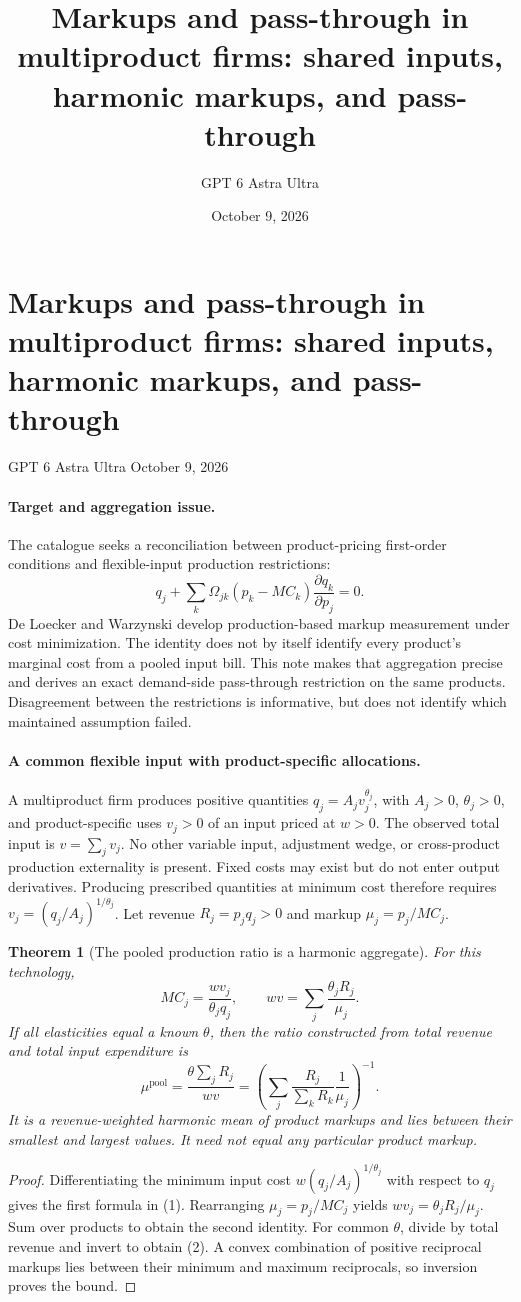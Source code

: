 \documentclass[11pt]{article}
\title{Markups and pass-through in multiproduct firms: shared inputs, harmonic markups, and pass-through}
\author{GPT 6 Astra Ultra}
\date{October 9, 2026}
\newtheorem{theorem}{Theorem}
\theoremstyle{definition}
\begin{document}
\section*{Markups and pass-through in multiproduct firms: shared inputs, harmonic markups, and pass-through}
\noindent GPT 6 Astra Ultra \hfill October 9, 2026

\paragraph{Target and aggregation issue.}
The catalogue seeks a reconciliation between product-pricing first-order conditions and flexible-input production restrictions:
\[
 q_j+\sum_k\Omega_{jk}(p_k-MC_k)
                   \frac{\partial q_k}{\partial p_j}=0.
\]
De Loecker and Warzynski \cite{production} develop production-based markup measurement under cost minimization. The identity does not by itself identify every product's marginal cost from a pooled input bill. This note makes that aggregation precise and derives an exact demand-side pass-through restriction on the same products. Disagreement between the restrictions is informative, but does not identify which maintained assumption failed.

\paragraph{A common flexible input with product-specific allocations.}
A multiproduct firm produces positive quantities $q_j=A_jv_j^{\theta_j}$, with $A_j>0$, $\theta_j>0$, and product-specific uses $v_j>0$ of an input priced at $w>0$. The observed total input is $v=\sum_jv_j$. No other variable input, adjustment wedge, or cross-product production externality is present. Fixed costs may exist but do not enter output derivatives. Producing prescribed quantities at minimum cost therefore requires $v_j=(q_j/A_j)^{1/\theta_j}$. Let revenue $R_j=p_jq_j>0$ and markup $\mu_j=p_j/MC_j$.

\begin{theorem}[The pooled production ratio is a harmonic aggregate]
For this technology,
\[
 MC_j=\frac{wv_j}{\theta_jq_j},\qquad
 wv=\sum_j\frac{\theta_jR_j}{\mu_j}.
 \tag{1}
\]
If all elasticities equal a known $\theta$, then the ratio constructed from total revenue and total input expenditure is
\[
 \mu^{\mathrm{pool}}=\frac{\theta\sum_jR_j}{wv}
 =\left(\sum_j\frac{R_j}{\sum_kR_k}\frac1{\mu_j}\right)^{-1}.
 \tag{2}
\]
It is a revenue-weighted harmonic mean of product markups and lies between their smallest and largest values. It need not equal any particular product markup.
\end{theorem}
\begin{proof}
Differentiating the minimum input cost $w(q_j/A_j)^{1/\theta_j}$ with respect to $q_j$ gives the first formula in (1). Rearranging $\mu_j=p_j/MC_j$ yields $wv_j=\theta_jR_j/\mu_j$. Sum over products to obtain the second identity. For common $\theta$, divide by total revenue and invert to obtain (2). A convex combination of positive reciprocal markups lies between their minimum and maximum reciprocals, so inversion proves the bound.
\end{proof}
\end{document}
